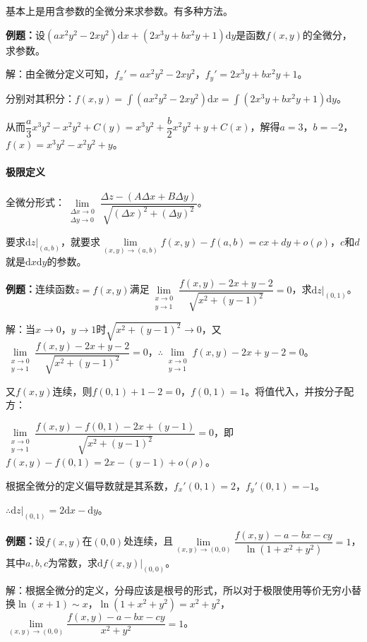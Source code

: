 \documentclass[UTF8, 12pt]{ctexart}
\begin{document}
基本上是用含参数的全微分来求参数。有多种方法。

\textbf{例题：}设$(ax^2y^2-2xy^2)\textrm{d}x+(2x^3y+bx^2y+1)\textrm{d}y$是函数$f(x,y)$的全微分，求参数。

解：由全微分定义可知，$f_x'=ax^2y^2-2xy^2$，$f_y'=2x^3y+bx^2y+1$。

分别对其积分：$f(x,y)=\int(ax^2y^2-2xy^2)\textrm{d}x=\int(2x^3y+bx^2y+1)\textrm{d}y$。

从而$\dfrac{a}{3}x^3y^2-x^2y^2+C(y)=x^3y^2+\dfrac{b}{2}x^2y^2+y+C(x)$，解得$a=3$，$b=-2$，$f(x)=x^3y^2-x^2y^2+y$。

\paragraph{极限定义} \leavevmode \medskip

全微分形式：$\lim\limits_{\substack{\Delta x\to0\\\Delta y\to0}}\dfrac{\Delta z-(A\Delta x+B\Delta y)}{\sqrt{(\Delta x)^2+(\Delta y)^2}}$。

要求$\textrm{d}z|_{(a,b)}$，就要求$\lim\limits_{(x,y)\to(a,b)}f(x,y)-f(a,b)=cx+dy+o(\rho)$，$c$和$d$就是$\textrm{d}x\textrm{d}y$的参数。

\textbf{例题：}连续函数$z=f(x,y)$满足$\lim\limits_{\substack{x\to0\\ y\to1}}\dfrac{f(x,y)-2x+y-2}{\sqrt{x^2+(y-1)^2}}=0$，求$\textrm{d}z|_{(0,1)}$。

解：当$x\to0$，$y\to1$时$\sqrt{x^2+(y-1)^2}\to0$，又$\lim\limits_{\substack{x\to0\\ y\to1}}\dfrac{f(x,y)-2x+y-2}{\sqrt{x^2+(y-1)^2}}=0$，$\therefore\lim\limits_{\substack{x\to0\\ y\to1}}f(x,y)-2x+y-2=0$。

又$f(x,y)$连续，则$f(0,1)+1-2=0$，$f(0,1)=1$。将值代入，并按分子配方：

$\lim\limits_{\substack{x\to0\\ y\to1}}\dfrac{f(x,y)-f(0,1)-2x+(y-1)}{\sqrt{x^2+(y-1)^2}}=0$，即$f(x,y)-f(0,1)=2x-(y-1)+o(\rho)$。

根据全微分的定义偏导数就是其系数，$f_x'(0,1)=2$，$f_y'(0,1)=-1$。

$\therefore\textrm{d}z|_{(0,1)}=2\textrm{d}x-\textrm{d}y$。

\textbf{例题：}设$f(x,y)$在$(0,0)$处连续，且$\lim\limits_{(x,y)\to(0,0)}\dfrac{f(x,y)-a-bx-cy}{\ln(1+x^2+y^2)}=1$，其中$a,b,c$为常数，求$\textrm{d}f(x,y)|_{(0,0)}$。

解：根据全微分的定义，分母应该是根号的形式，所以对于极限使用等价无穷小替换$\ln(x+1)\sim x$，$\ln(1+x^2+y^2)=x^2+y^2$，$\lim\limits_{(x,y)\to(0,0)}\dfrac{f(x,y)-a-bx-cy}{x^2+y^2}=1$。
\end{document}
